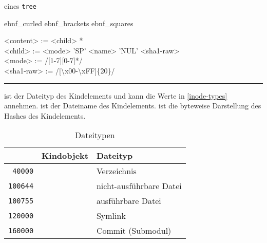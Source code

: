 \documentclass[
	nonacm,%
	screen,%
	sigplan,
]{acmart}
\newenvironment{myebnf}[1][4em]{%
	\begin{minipage}{.9\linewidth}%
		\expandafter \undef \csname ebnf_curled\endcsname
		\expandafter \undef \csname ebnf_brackets\endcsname
		\expandafter \undef \csname ebnf_squares\endcsname
		\begin{ebnf}[#1]%
}{%
		\end{ebnf}%
	\end{minipage}%
}
\begin{document}
\begin{format}
	\caption{ eines \texttt{tree}}%
	\label{tree-syntax}%
	\begin{myebnf}[7em]
		<content> := <child> * \\
		<child> := <mode> 'SP' <name> 'NUL' <sha1-raw> \\
		<mode> := /[1-7][0-7]*/ \\
		<sha1-raw> := /[\textbackslash x00-\textbackslash xFF]\{20\}/
	\end{myebnf}

	\vspace{\fboxsep}%
	\hrule
	\vspace{\fboxsep}

	\begin{minipage}{\dimexpr \linewidth -2\fboxsep \relax}
		 ist der Dateityp \cite{inode} des Kindelements und kann die Werte in \autoref{inode-types} annehmen.  ist der Dateiname des Kindelements.  ist die byteweise Darstellung des Hashes des Kindelements.
	\end{minipage}
\end{format}

\begin{table}[thp]
	\caption{Dateitypen}%
	\label{inode-types}%
	\begin{tabular}{c c l}
		\hline
		\EbnfNonTerminal{mode} \cite{inode} & Kindobjekt & Dateityp \\
		\hline
		\texttt{ 40000} & \nameref{tree} & Verzeichnis \\
		\texttt{100644} & \nameref{blob} & nicht-ausführbare Datei \\
		\texttt{100755} & \nameref{blob} & ausführbare Datei \\
		\texttt{120000} & \nameref{blob} & Symlink \\
		\texttt{160000} & \nameref{commit} & Commit (Submodul) \\
		\hline
	\end{tabular}%
	\vspace{-1em}%
\end{table}
\end{document}
